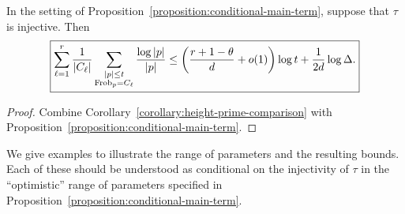 \documentclass[reqno]{amsart} 
\begin{document}
\begin{corollary}\label{corollary:conditional-prime-main-term}
  In the setting of Proposition~\ref{proposition:conditional-main-term}, suppose that $\tau$ is injective.  Then
  \begin{equation}\label{eq:cus646868v}
    \boxed{
      \sum_{\ell=1}^r\frac1{|C_\ell|}
      \sum_{\substack{|p|\leq t\\\operatorname{Frob}_p=C_\ell}}
      \frac{\log|p|}{|p|}
      \leq\left(\frac{r+1-\theta}{d}+o(1)\right)\log t
      +\frac1{2d}\log\Delta.
    }
  \end{equation}
\end{corollary}
\begin{proof}
  Combine Corollary~\ref{corollary:height-prime-comparison} with Proposition~\ref{proposition:conditional-main-term}.
\end{proof}

We give examples to illustrate the range of parameters and the resulting bounds.  Each of these should be understood as conditional on the injectivity of $\tau$ in the ``optimistic'' range of parameters specified in Proposition~\ref{proposition:conditional-main-term}.
\end{document}
